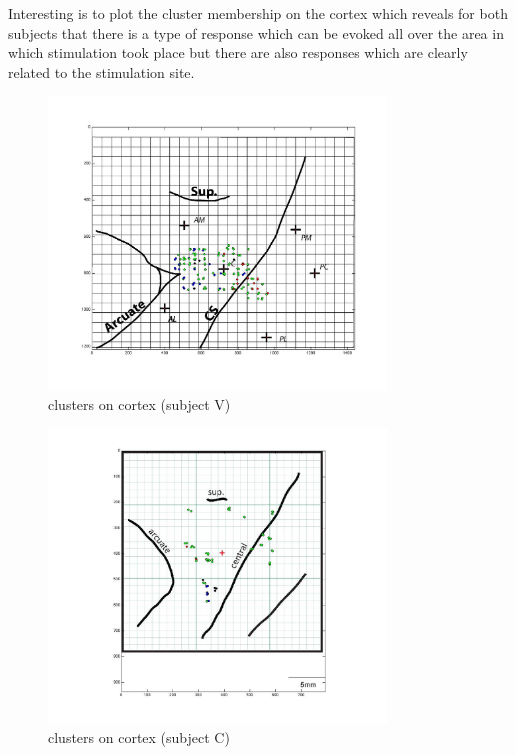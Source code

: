Interesting is to plot the cluster membership on the cortex which reveals for both subjects that there is a type of response which can be evoked all over the area in which stimulation took place but there are also responses which are clearly related to the stimulation site. 
\begin{figure}[ht]
    \centering
        \includegraphics[width=0.8\textwidth]{images/cluster_vega.jpg}
    \caption{clusters on cortex (subject V)}
    \label{sg:fig:images_cluster_vega}
\end{figure}
\begin{figure}[ht]
    \centering
        \includegraphics[width=0.8\textwidth]{images/cluster_chalva.jpg}
    \caption{clusters on cortex (subject C)}
    \label{sg:fig:images_cluster_chalva}
\end{figure}


